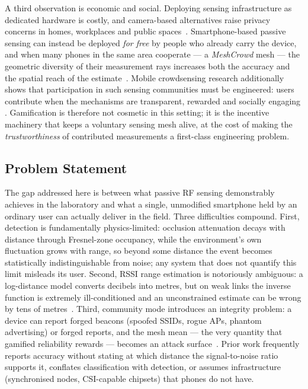\documentclass[journal,10pt]{IEEEtran}
\begin{document}
A third observation is economic and social. Deploying sensing infrastructure as
dedicated hardware is costly, and camera-based alternatives raise privacy
concerns in homes, workplaces and public spaces~\cite{khan2023,zhou2020,dmip2023}.
Smartphone-based passive sensing can instead be deployed \emph{for free} by
people who already carry the device, and when many phones in the same area
cooperate --- a \emph{MeshCrowd} mesh --- the geometric diversity of their
measurement rays increases both the accuracy and the spatial reach of the
estimate~\cite{li2024}. Mobile crowdsensing research additionally shows that
participation in such sensing communities must be engineered: users contribute
when the mechanisms are transparent, rewarded and socially engaging
\cite{zhang2022,wang2018}. Gamification is therefore not cosmetic in this
setting; it is the incentive machinery that keeps a voluntary sensing mesh
alive, at the cost of making the \emph{trustworthiness} of contributed
measurements a first-class engineering problem.

\subsection{Problem Statement}
The gap addressed here is between what passive RF sensing demonstrably achieves
in the laboratory and what a single, unmodified smartphone held by an ordinary
user can actually deliver in the field. Three difficulties compound. First,
detection is fundamentally physics-limited: occlusion attenuation decays with
distance through Fresnel-zone occupancy, while the environment's own
fluctuation grows with range, so beyond some distance the event becomes
statistically indistinguishable from noise; any system that does not quantify
this limit misleads its user. Second, RSSI range estimation is notoriously
ambiguous: a log-distance model converts decibels into metres, but on weak links
the inverse function is extremely ill-conditioned and an unconstrained estimate
can be wrong by tens of metres~\cite{ramirez2021,milano2024}. Third, community
mode introduces an integrity problem: a device can report forged beacons
(spoofed SSIDs, rogue APs, phantom advertising) or forged reports, and the mesh
mean --- the very quantity that gamified reliability rewards --- becomes an
attack surface~\cite{casar2022,antonioli2020}. Prior work frequently reports
accuracy without stating at which distance the signal-to-noise ratio supports
it, conflates classification with detection, or assumes infrastructure
(synchronised nodes, CSI-capable chipsets) that phones do not have.
\end{document}
